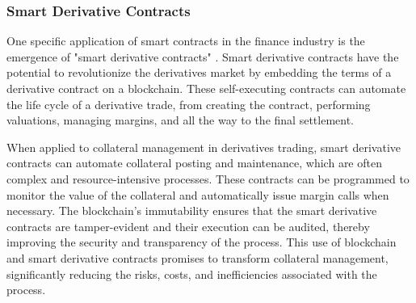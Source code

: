 \subsubsection{Smart Derivative Contracts}
\label{subsec:smart_derivative_contracts}
One specific application of smart contracts in the finance industry is the emergence of "smart derivative contracts" \citep{clack2019smart}. Smart derivative contracts have the potential to revolutionize the derivatives market by embedding the terms of a derivative contract on a blockchain. These self-executing contracts can automate the life cycle of a derivative trade, from creating the contract, performing valuations, managing margins, and all the way to the final settlement.

When applied to collateral management in derivatives trading, smart derivative contracts can automate collateral posting and maintenance, which are often complex and resource-intensive processes. These contracts can be programmed to monitor the value of the collateral and automatically issue margin calls when necessary. The blockchain's immutability ensures that the smart derivative contracts are tamper-evident and their execution can be audited, thereby improving the security and transparency of the process. This use of blockchain and smart derivative contracts promises to transform collateral management, significantly reducing the risks, costs, and inefficiencies associated with the process.